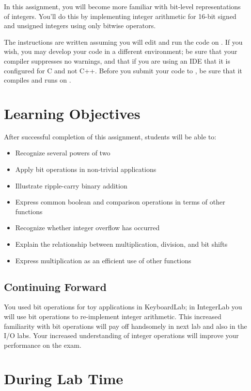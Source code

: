 In this assignment, you will become more familiar with bit-level representations of integers.
You'll do this by implementing integer arithmetic for 16-bit signed and unsigned integers using only bitwise operators.

The instructions are written assuming you will edit and run the code on \runtimeenvironment.
If you wish, you may develop your code in a different environment;
be sure that your compiler suppresses no warnings, and that if you are using an IDE that it is configured for C and not C++.
Before you submit your code to \filesubmission, be sure that it compiles and runs on \runtimeenvironment.

\section*{Learning Objectives}

After successful completion of this assignment, students will be able to:
\begin{itemize}
    \item Recognize several powers of two
    \item Apply bit operations in non-trivial applications
    \item Illustrate ripple-carry binary addition
    \item Express common boolean and comparison operations in terms of other functions
    \item Recognize whether integer overflow has occurred
    \item Explain the relationship between multiplication, division, and bit shifts
    \item Express multiplication as an efficient use of other functions
\end{itemize}

\subsection*{Continuing Forward}

You used bit operations for toy applications in KeyboardLab;
in IntegerLab you will use bit operations to re-implement integer arithmetic.
This increased familiarity with bit operations will pay off handsomely in next lab and also in the I/O labs.
Your increased understanding of integer operations will improve your performance on the exam.

\section*{During Lab Time}

